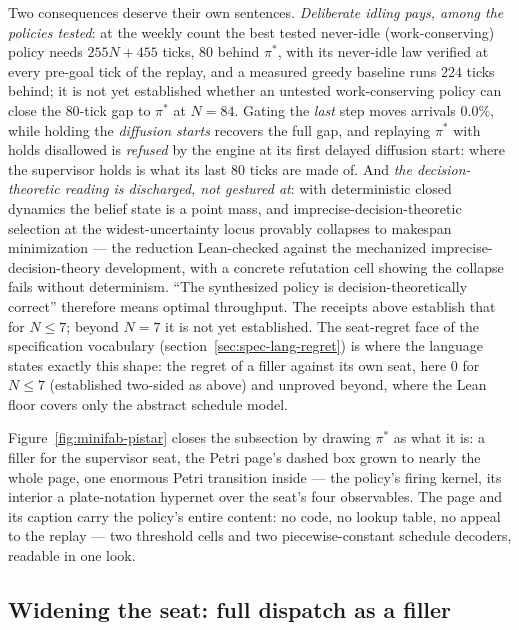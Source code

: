 Two consequences deserve their own sentences. \emph{Deliberate
idling pays, among the policies tested}: at the weekly count the
best tested never-idle (work-conserving) policy needs $255N + 455$
ticks, $80$ behind $\pi^{\ast}$, with its never-idle law verified at
every pre-goal tick of the replay, and a measured greedy baseline
runs $224$ ticks behind; it is not yet established whether an untested
work-conserving policy can close the $80$-tick gap to $\pi^{\ast}$ at $N = 84$. Gating the \emph{last} step moves arrivals
$0.0\%$, while holding the \emph{diffusion starts} recovers the full
gap, and replaying $\pi^{\ast}$ with holds disallowed is
\emph{refused} by the engine at its first delayed diffusion start:
where the supervisor holds is what its last $80$ ticks are made of.
And \emph{the decision-theoretic reading is discharged, not
gestured at}: with deterministic closed dynamics the belief state
is a point mass, and imprecise-decision-theoretic selection at the
widest-uncertainty locus provably collapses to makespan
minimization --- the reduction Lean-checked against the
mechanized imprecise-decision-theory development, with a concrete
refutation cell showing the collapse fails without determinism.
``The synthesized policy is decision-theoretically correct''
therefore means optimal throughput. The receipts above establish
that for $N \le 7$; beyond $N = 7$ it is not yet established. The
seat-regret
face of the specification vocabulary
(section~\ref{sec:spec-lang-regret}) is where the language states
exactly this shape: the regret of a filler against its own seat,
here $0$ for $N \le 7$ (established two-sided as above) and
unproved beyond, where the Lean floor covers only the abstract
schedule model.

Figure~\ref{fig:minifab-pistar} closes the subsection by drawing
$\pi^{\ast}$ as what it is: a filler for the supervisor seat, the
Petri page's dashed box grown to nearly the whole page, one
enormous Petri transition inside --- the policy's firing kernel,
its interior a plate-notation hypernet over the seat's four
observables. The page and its caption carry the policy's entire
content: no code, no lookup table, no appeal to the replay --- two
threshold cells and two piecewise-constant schedule decoders,
readable in one look.



\subsection{Widening the seat: full dispatch as a filler}
\label{sec:minifab-fulldispatch}

